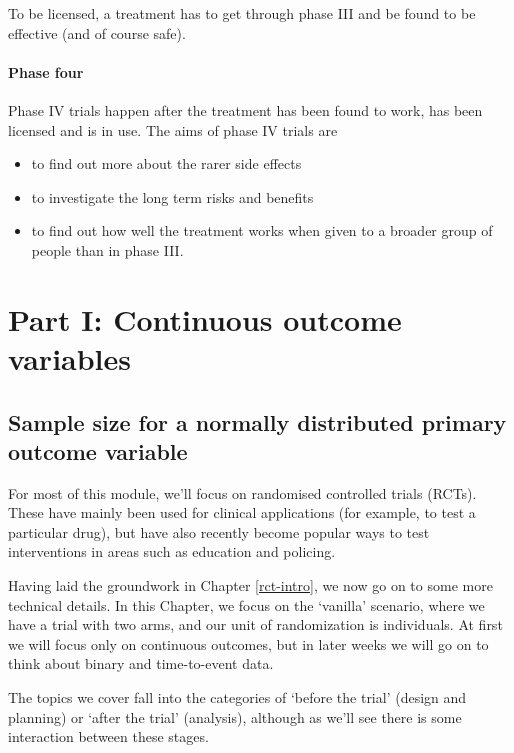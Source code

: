 \documentclass[
  openany]{book}
\providecommand{\tightlist}{%
  \setlength{\itemsep}{0pt}\setlength{\parskip}{0pt}}
\theoremstyle{definition}
\theoremstyle{definition}
\theoremstyle{definition}
\theoremstyle{definition}
\theoremstyle{remark}
\begin{document}
To be licensed, a treatment has to get through phase III and be found to be effective (and of course safe).

\subsection*{Phase four}\label{phase-four}

Phase IV trials happen after the treatment has been found to work, has been licensed and is in use. The aims of phase IV trials are

\begin{itemize}
\tightlist
\item
  to find out more about the rarer side effects
\item
  to investigate the long term risks and benefits
\item
  to find out how well the treatment works when given to a broader group of people than in phase III.
\end{itemize}

\part{Part I: Continuous outcome variables}\label{part-part-i-continuous-outcome-variables}

\chapter{Sample size for a normally distributed primary outcome variable}\label{rct-plan}

For most of this module, we'll focus on randomised controlled trials (RCTs). These have mainly been used for clinical applications (for example, to test a particular drug), but have also recently become popular ways to test interventions in areas such as education and policing.

Having laid the groundwork in Chapter \ref{rct-intro}, we now go on to some more technical details. In this Chapter, we focus on the `vanilla' scenario, where we have a trial with two arms, and our unit of randomization is individuals. At first we will focus only on continuous outcomes, but in later weeks we will go on to think about binary and time-to-event data.

The topics we cover fall into the categories of `before the trial' (design and planning) or `after the trial' (analysis), although as we'll see there is some interaction between these stages.
\end{document}
